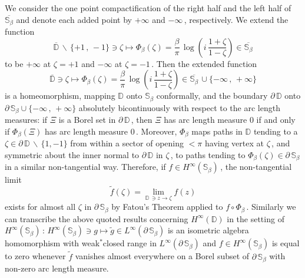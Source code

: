 \documentclass[reqno]{amsart}
\theoremstyle{definition}
\theoremstyle{remark}
\numberwithin{equation}{section}
\theoremstyle{plain}
\begin{document}
We consider the one point compactification of the right half
and the left half of $\overline {\mathbb S_\beta}$ and denote
each added point by $+\infty$ and $-\infty\,$, respectively.
We extend the function
\begin{equation*}
\overline {\mathbb D}\,\backslash\,\{ +1\, ,\, -1\}\ni
\zeta\longmapsto \Phi_\beta (\zeta ) =\frac \beta\pi \,\log
\left( i\,\frac{1+\zeta}{1-\zeta}\right)\in
\overline {\mathbb S_\beta}
\end{equation*}
to be $+\infty$ at $\zeta =+1$ and $-\infty$ at $\zeta =-1\,$.
Then the extended function
\begin{equation*}
\overline {\mathbb D}\ni
\zeta\longmapsto \Phi_\beta (\zeta ) =\frac \beta\pi \,\log
\left( i\,\frac{1+\zeta}{1-\zeta}\right)\in
\overline {\mathbb S_\beta}\,\cup\{ -\infty\, ,\, +\infty\}
\end{equation*}
is a homeomorphism, mapping $\mathbb D$ onto $\mathbb S_\beta$
conformally, and the boundary $\partial\,\mathbb D$ onto
$\partial\,\mathbb S_\beta\cup\{ -\infty\, ,\, +\infty\}$ absolutely
bicontinuously with respect to the arc length measures: if $\Xi$
is a Borel set in $\partial\,\mathbb D\,$, then $\Xi$ has arc
length measure $0$ if and only if $\Phi_\beta (\Xi )$ has arc
length measure $0\,$. Moreover, $\Phi_\beta$ maps paths in
$\mathbb D$ tending to a $\zeta\in\partial\,\mathbb D\,\backslash\,
\{ 1,-1\}$ from within a sector of opening $<\pi$ having vertex
at $\zeta\,$, and symmetric about the inner normal to
$\partial\,\mathbb D$ in $\zeta\,$, to paths tending to
$\Phi_\beta (\zeta )\in\partial\,\mathbb S_\beta$ in a similar
non-tangential way. Therefore, if $f\in H^\infty
(\mathbb S_\beta )\,$, the non-tangential limit
\begin{equation*}
\widetilde f (\zeta ) =\lim_{\mathbb D\,\ni z\to\zeta} f(z)
\end{equation*}
exists for almost all $\zeta$ in $\partial\,\mathbb S_\beta$
by Fatou's Theorem applied to $f\circ\Phi_\beta\,$. Similarly
we can transcribe the above quoted results concerning
$H^\infty (\mathbb D)$ in the setting of
$H^\infty (\mathbb S_\beta)\,$:
$H^\infty (\mathbb S_\beta )\ni g\longmapsto\widetilde g\in
L^\infty (\partial\,\mathbb S_\beta)$ is an isometric algebra
homomorphism with weak${}^*$closed range in
$L^\infty (\partial\,\mathbb S_\beta)$ and
$f\in H^\infty (\mathbb S_\beta)$ is equal to zero whenever
$\widetilde f$ vanishes almost everywhere on a Borel subset of
$\partial\,\mathbb S_\beta$ with non-zero arc length measure.
\smallskip
\end{document}
